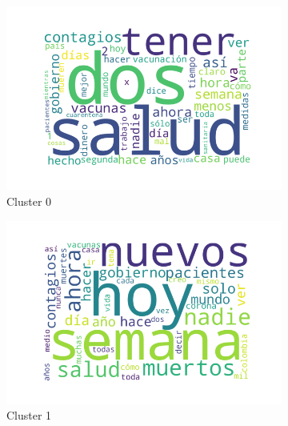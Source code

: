 \begin{figure}
    \centering
    \begin{subfigure}[b]{0.75\textwidth}
        \centering
        \includegraphics[width=\textwidth]{results/TopicDetection/es/cluster0.png}
        \caption{Cluster 0}
        \label{fig:es_c0}
    \end{subfigure}
    \hfill
    \begin{subfigure}[b]{0.75\textwidth}
        \centering
        \includegraphics[width=\textwidth]{results/TopicDetection/es/cluster1.png}
        \caption{Cluster 1}
        \label{fig:es_c1}
    \end{subfigure}
    \hfill
    \begin{subfigure}[b]{0.75\textwidth}
        \centering

\end{subfigure}
\end{figure}
